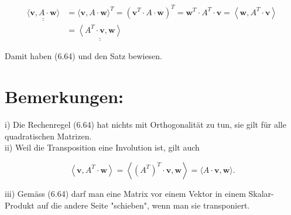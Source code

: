 \documentclass[10pt]{article}
\begin{document}
\begin{align*}
\underline{\underline{\langle\mathbf{v}, A \cdot \mathbf{w}\rangle}} & =\langle\mathbf{v}, A \cdot \mathbf{w}\rangle^{T}=\left(\mathbf{v}^{T} \cdot A \cdot \mathbf{w}\right)^{T}=\mathbf{w}^{T} \cdot A^{T} \cdot \mathbf{v}=\left\langle\mathbf{w}, A^{T} \cdot \mathbf{v}\right\rangle \\
& =\underline{\underline{\left\langle A^{T} \cdot \mathbf{v}, \mathbf{w}\right\rangle}} \tag{6.65}
\end{align*}


Damit haben (6.64) und den Satz bewiesen.

\section*{Bemerkungen:}
i) Die Rechenregel (6.64) hat nichts mit Orthogonalität zu tun, sie gilt für alle quadratischen Matrizen.\\
ii) Weil die Transposition eine Involution ist, gilt auch


\begin{equation*}
\left\langle\mathbf{v}, A^{T} \cdot \mathbf{w}\right\rangle=\left\langle\left(A^{T}\right)^{T} \cdot \mathbf{v}, \mathbf{w}\right\rangle=\langle A \cdot \mathbf{v}, \mathbf{w}\rangle . \tag{6.66}
\end{equation*}


iii) Gemäss (6.64) darf man eine Matrix vor einem Vektor in einem Skalar-Produkt auf die andere Seite "schieben", wenn man sie transponiert.
\end{document}

